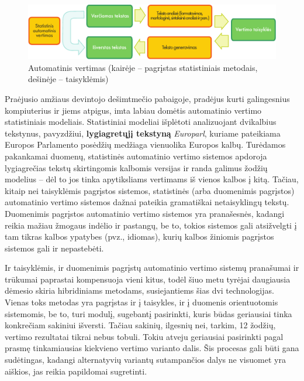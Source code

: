 \begin{multicols}{2}
\begin{figure}[htb]
  \center
  \includegraphics[width=\textwidth]{../_media/lithuanian/machine_translation}
  \caption{Automatinis vertimas (kairėje – pagrįstas statistiniais metodais, dešinėje – taisyklėmis)}  %
  \label{fig:mtarch_de}
\end{figure}

 Praėjusio amžiaus devintojo dešimtmečio pabaigoje, pradėjus kurti galingesnius kompiuterius ir jiems atpigus, imta labiau domėtis automatinio vertimo statistiniais modeliais. Statistiniai modeliai išplėtoti analizuojant dvikalbius tekstynus, pavyzdžiui, \textbf{lygiagretųjį tekstyną} \textit{Europarl}, kuriame pateikiama Europos Parlamento posėdžių medžiaga vienuolika Europos kalbų. Turėdamos pakankamai duomenų, statistinės automatinio vertimo sistemos apdoroja lygiagrečias tekstų skirtingomis kalbomis versijas ir randa galimus žodžių modelius – dėl to jos tinka apytiksliams vertimams iš vienos kalbos į kitą. Tačiau, kitaip nei taisyklėmis pagrįstos sistemos, statistinės (arba duomenimis pagrįstos) automatinio vertimo sistemos dažnai pateikia gramatiškai netaisyklingų tekstų. Duomenimis pagrįstos automatinio vertimo sistemos yra pranašesnės, kadangi reikia mažiau žmogaus indėlio ir pastangų, be to, tokios sistemos gali atsižvelgti į tam tikras kalbos ypatybes (pvz., idiomas), kurių kalbos žiniomis pagrįstos sistemos gali ir nepastebėti.    


Ir taisyklėmis, ir duomenimis pagrįstų automatinio vertimo sistemų pranašumai ir trūkumai paprastai kompensuoja vieni kitus, todėl šiuo metu tyrėjai daugiausia dėmesio skiria hibridiniams metodams, susiejantiems šias dvi technologijas. Vienas toks metodas yra pagrįstas ir į taisykles, ir į duomenis orientuotomis sistemomis, be to, turi modulį, sugebantį pasirinkti, kuris būdas geriausiai tinka konkrečiam sakiniui išversti. Tačiau sakinių, ilgesnių nei, tarkim, 12 žodžių, vertimo rezultatai tikrai nebus tobuli. Tokiu atveju geriausiai pasirinkti pagal prasmę tinkamiausias kiekvieno vertimo varianto dalis. Šis procesas gali būti gana sudėtingas, kadangi alternatyvių variantų sutampančios dalys ne visuomet yra aiškios, jas reikia papildomai sugretinti. 


\end{multicols}
